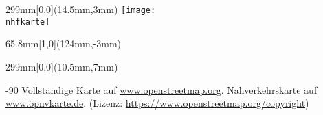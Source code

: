 \documentclass[a4paper]{memoir}
\begin{document}
\pagestyle{empty}


\null
\newpage

\impressum{\redaktionsschluss}
\null
\newpage

\pagestyle{empty}

\begin{textblock*}{299mm}[0,0](14.5mm,3mm)
  \texttt{[image: \\nhfkarte]}
\end{textblock*}

\begin{textblock*}{65.8mm}[1,0](124mm,-3mm)
  \setlength\fboxsep{0pt}
  \setlength\fboxrule{0.4mm}
\end{textblock*}


\begin{textblock*}{299mm}[0,0](10.5mm,7mm)
  \begin{turn}{-90}
    Vollständige Karte auf \url{www.openstreetmap.org}.
    Nahverkehrskarte auf \url{www.öpnvkarte.de}.
    (Lizenz: \url{https://www.openstreetmap.org/copyright})
  \end{turn}
\end{textblock*}
\null
\newpage
\end{document}
